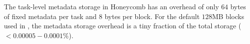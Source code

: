  The task-level metadata storage in Honeycomb has an overhead of only $64$ bytes of fixed metadata per task and $8$ bytes per block. For the default $128$MB blocks used in \jiffy, the metadata storage overhead is a tiny fraction of the total storage ($<0.00005-0.0001\%$).











%
%
%
%
%
%
%
